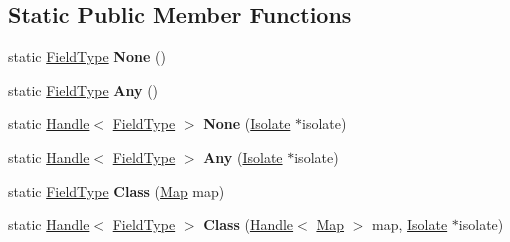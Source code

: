 \subsection*{Static Public Member Functions}
\begin{DoxyCompactItemize}
\item 
\mbox{\label{classv8_1_1internal_1_1FieldType_aaa7e4d2d710761603bf7cb131d9400a5}} 
static \mbox{\hyperlink{classv8_1_1internal_1_1FieldType}{Field\+Type}} {\bfseries None} ()
\item 
\mbox{\label{classv8_1_1internal_1_1FieldType_a358172560c73d94e34251199c2e8b5c1}} 
static \mbox{\hyperlink{classv8_1_1internal_1_1FieldType}{Field\+Type}} {\bfseries Any} ()
\item 
\mbox{\label{classv8_1_1internal_1_1FieldType_ac2d0cb4663e07e8c3498503f33fc399d}} 
static \mbox{\hyperlink{classv8_1_1internal_1_1Handle}{Handle}}$<$ \mbox{\hyperlink{classv8_1_1internal_1_1FieldType}{Field\+Type}} $>$ {\bfseries None} (\mbox{\hyperlink{classv8_1_1internal_1_1Isolate}{Isolate}} $\ast$isolate)
\item 
\mbox{\label{classv8_1_1internal_1_1FieldType_ad4bdf153640a489fce033623e4203c8c}} 
static \mbox{\hyperlink{classv8_1_1internal_1_1Handle}{Handle}}$<$ \mbox{\hyperlink{classv8_1_1internal_1_1FieldType}{Field\+Type}} $>$ {\bfseries Any} (\mbox{\hyperlink{classv8_1_1internal_1_1Isolate}{Isolate}} $\ast$isolate)
\item 
\mbox{\label{classv8_1_1internal_1_1FieldType_a195ff6dda6bf9df75db0ca5b9daf2aa2}} 
static \mbox{\hyperlink{classv8_1_1internal_1_1FieldType}{Field\+Type}} {\bfseries Class} (\mbox{\hyperlink{classv8_1_1internal_1_1Map}{Map}} map)
\item 
\mbox{\label{classv8_1_1internal_1_1FieldType_af46d4ac071dd232d86d4c0c674429e80}} 
static \mbox{\hyperlink{classv8_1_1internal_1_1Handle}{Handle}}$<$ \mbox{\hyperlink{classv8_1_1internal_1_1FieldType}{Field\+Type}} $>$ {\bfseries Class} (\mbox{\hyperlink{classv8_1_1internal_1_1Handle}{Handle}}$<$ \mbox{\hyperlink{classv8_1_1internal_1_1Map}{Map}} $>$ map, \mbox{\hyperlink{classv8_1_1internal_1_1Isolate}{Isolate}} $\ast$isolate)

\end{DoxyCompactItemize}
